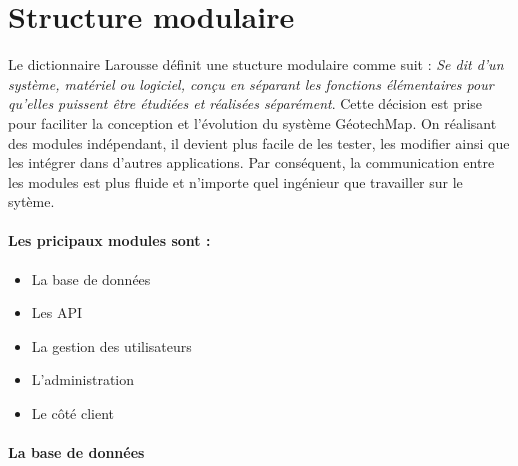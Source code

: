         \section{Structure modulaire}
                Le dictionnaire Larousse définit une stucture modulaire comme suit : 
                \textit{Se dit d'un système, matériel ou logiciel, conçu en séparant les 
                fonctions élémentaires pour qu'elles puissent être étudiées et réalisées séparément}\cite{Larousse}. 
                Cette décision est prise pour faciliter la conception et l'évolution du système GéotechMap.
                On réalisant des modules indépendant, il devient plus facile de les tester, les modifier 
                ainsi que les intégrer dans d'autres applications. Par conséquent, la communication entre les modules 
                est plus fluide et n'importe quel ingénieur que travailler sur le sytème.
                \paragraph{Les pricipaux modules sont :}
                \begin{itemize}
                        \item La base de données
                        \item Les API
                        \item La gestion des utilisateurs
                        \item L'administration
                        \item Le côté client
                \end{itemize}
                \paragraph{La base de données}
